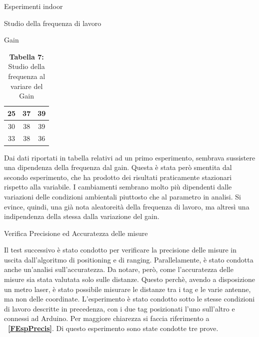 \documentclass[12pt]{report}
\begin{document}
\begin{section}{Esperimenti indoor}
\begin{subsection}{Studio della frequenza di lavoro}
\begin{subsubsection}{Gain}
\begin{table}[h]
\begin{tabular}{|c|c|c|}
					\hline
					25&				37&		39\\ 
					\hline
					30&				38&		39\\ 
					\hline
					33&				38&		36\\ 
					\hline
				\end{tabular}
				\caption{\textbf{Tabella 7: } Studio della frequenza al variare del Gain\label{TGainF}}
			\end{table}
			Dai dati riportati in tabella relativi ad un primo esperimento, sembrava sussistere una dipendenza della frequenza dal gain. Questa è stata però smentita dal secondo esperimento, che ha prodotto dei risultati praticamente stazionari rispetto alla variabile. I cambiamenti sembrano molto più dipendenti dalle variazioni 					delle condizioni ambientali piuttosto che al parametro in analisi. Si evince, quindi, una già nota aleatoreità della frequenza di lavoro, ma altresì una indipendenza della stessa dalla variazione del gain.

		\end{subsubsection}
		\end{subsection}

		\begin{subsection}{Verifica Precisione ed Accuratezza delle misure}

			Il test successivo è stato condotto per verificare la precisione delle misure in uscita dall’algoritmo di positioning e di ranging. Parallelamente, è stato condotta anche un’analisi sull’accuratezza. Da notare, però, come l’accuratezza delle misure sia stata valutata solo sulle distanze. Questo perchè, avendo a 							disposizione un metro laser, è stato possibile misurare le distanze tra i tag e le varie antenne, ma non delle coordinate.
			L’esperimento è stato condotto sotto le stesse condizioni di lavoro descritte in precedenza, con i due tag posizionati l’uno sull’altro e connessi ad Arduino. Per maggiore chiarezza si faccia riferimento a  \textbf{\figurename~\ref{FEspPrecis}}. Di questo esperimento sono state condotte tre prove.
			

\end{subsection}
\end{section}
\end{document}
